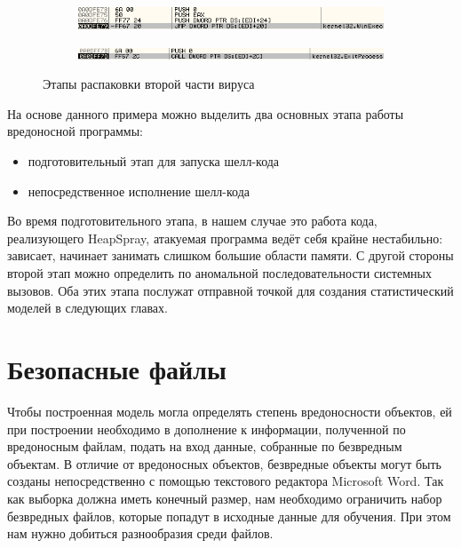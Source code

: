 \begin{figure}[ht]
\begin{subfigure}[h]{0.6\textwidth}
    \end{subfigure}        
    \begin{subfigure}[h]{0.6\textwidth}
    \centering
        \includegraphics[scale=0.7]{1.pdf/pasted-image-41.png}
        \caption{}
        
    \end{subfigure}         
    \begin{subfigure}[h]{0.6\textwidth}
    \centering
        \includegraphics[scale=0.7]{1.pdf/pasted-image-43.png}
        \caption{}
    \end{subfigure}
    \caption{Этапы распаковки второй части вируса}
    \label{fig_parsetree}
\end{figure}

На основе данного примера можно выделить два основных этапа работы вредоносной программы:
\begin{itemize}
\item подготовительный этап для запуска шелл-кода
\item непосредственное исполнение шелл-кода
\end{itemize}

Во время подготовительного этапа, в нашем случае это работа кода, реализующего HeapSpray, атакуемая программа ведёт себя крайне нестабильно: зависает, начинает занимать слишком большие области памяти.
С другой стороны второй этап можно определить по аномальной последовательности системных вызовов.
Оба этих этапа послужат отправной точкой для создания статистический моделей в следующих главах.

\section{Безопасные файлы}

Чтобы построенная модель могла определять степень вредоносности объектов, ей при построении необходимо в дополнение к информации, полученной по вредоносным файлам, подать на вход данные, собранные по безвредным объектам.
В отличие от вредоносных объектов, безвредные объекты могут быть созданы непосредственно с помощью текстового редактора Microsoft Word.
Так как выборка должна иметь конечный размер, нам необходимо ограничить набор безвредных файлов, которые попадут в исходные данные для обучения.
При этом нам нужно добиться разнообразия среди файлов.

